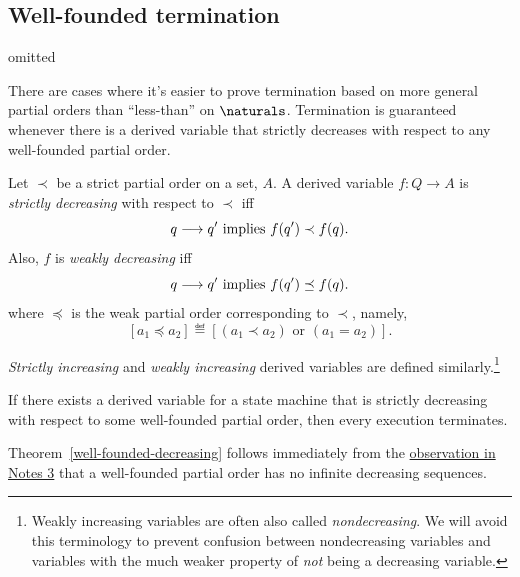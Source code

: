 \begin{editingnotes}
\section*{Well-founded termination}
omitted

There are cases where it's easier to prove termination based on more
general partial orders than ``less-than'' on $\naturals$.  Termination is
guaranteed whenever there is a derived variable that strictly decreases with
respect to any well-founded partial order.

\begin{definition}
Let $\prec$ be a strict partial order on a set, $A$.  A derived variable
$f : Q \to A$ is \emph{strictly decreasing} with respect to $\prec$ iff
\[
q \mathrel{\longrightarrow} q' \text{ implies } f(q') \prec f(q).
\]
Also, $f$ is \emph{weakly decreasing} iff
\[
q \mathrel{\longrightarrow} q' \text{  implies  } f(q') \preceq f(q).
\]
where $\preceq$ is the weak partial order corresponding to $\prec$,
namely,
\[
[a_1 \preceq a_2] \eqdef [(a_1 \prec a_2) \text{ or } (a_1=a_2)].
\]

\emph{Strictly increasing} and \emph{weakly increasing} derived variables
are defined similarly.\footnote{Weakly increasing variables are often also
called \emph{nondecreasing}.  We will avoid this terminology to prevent
confusion between nondecreasing variables and variables with the much
weaker property of \emph{not} being a decreasing variable.}
\end{definition}

\begin{theorem}\label{well-founded-decreasing}
  If there exists a derived variable for a state machine that is strictly
  decreasing with respect to some well-founded partial order, then every
  execution terminates.
\end{theorem}

Theorem~\ref{well-founded-decreasing} follows immediately from the
\href{http://courses.csail.mit.edu/6.042/spring08/ln3.pdf#infinite.decreasing}
{observation in Notes 3} that a well-founded partial order has no infinite
decreasing sequences.


\end{editingnotes}
